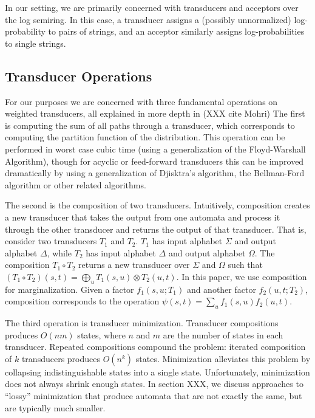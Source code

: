 \documentclass[11pt]{article}
\begin{document}
In our setting, we are primarily concerned with transducers and
acceptors over the log semiring. In this case, a transducer assigns
a (possibly unnormalized) log-probability to pairs of strings, and
an acceptor similarly assigns log-probabilities to single strings.

\subsection{Transducer Operations}

For our purposes we are concerned with three fundamental operations
on weighted transducers, all explained in more depth in (XXX cite
Mohri) The first is computing the sum of all paths through a
transducer, which corresponds to computing the partition function
of the distribution. This operation can be performed in worst case
cubic time (using a generalization of the Floyd-Warshall Algorithm),
though for acyclic or feed-forward transducers this can be improved
dramatically by using a generalization of Djisktra's algorithm, the
Bellman-Ford algorithm or other related algorithms.

The second is the composition of two transducers. Intuitively,
composition creates a new transducer that takes the output from one
automata and process it through the other transducer and returns
the output of that transducer. That is, consider two transducers
$T_1$ and $T_2$. $T_1$ has input alphabet $\Sigma$ and output
alphabet $\Delta$, while $T_2$ has input alphabet $\Delta$ and
output alphabet $\Omega$. The composition $T_1 \circ T_2$ returns
a new transducer over $\Sigma$ and $\Omega$ such that $(T_1 \circ
T_2)(s,t) = \bigoplus_{u} T_1(s,u)\otimes T_2(u,t)$. In this paper,
we use composition for marginalization. Given a factor $f_1(s,u;T_1)$
and another factor $f_2(u,t;T_2)$, composition corresponds to the
operation $\psi(s,t) = \sum_u f_1(s,u) f_2(u,t)$.

The third operation is transducer minimization. Transducer compositions
produces $O(nm)$ states, where $n$ and $m$ are the number of states
in each transducer. Repeated compositions compound the problem:
iterated composition of $k$ transducers produces $O(n^k)$ states.
Minimization alleviates this problem by collapsing indistinguishable
states into a single state.  Unfortunately, minimization does not
always shrink enough states. In section XXX, we discuss approaches
to ``lossy'' minimization that produce automata that are not exactly
the same, but are typically much smaller.
\end{document}

